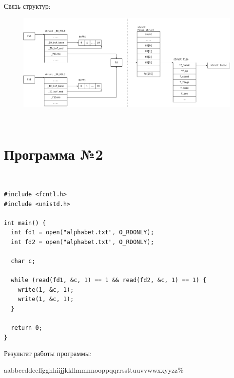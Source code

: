 Связь структур:
\begin{figure}[H]
	\centering
	\includegraphics[scale=0.5]{assets/d_1.png}
\end{figure}

~\newline
\section*{Программа №2}
~\newline
\begin{lstlisting}
#include <fcntl.h>
#include <unistd.h>

int main() {
  int fd1 = open("alphabet.txt", O_RDONLY);
  int fd2 = open("alphabet.txt", O_RDONLY);

  char c;

  while (read(fd1, &c, 1) == 1 && read(fd2, &c, 1) == 1) {
    write(1, &c, 1);
    write(1, &c, 1);
  }

  return 0;
}
\end{lstlisting}
Результат работы программы:

aabbccddeeffgghhiijjkkllmmnnooppqqrrssttuuvvwwxxyyzz\%

